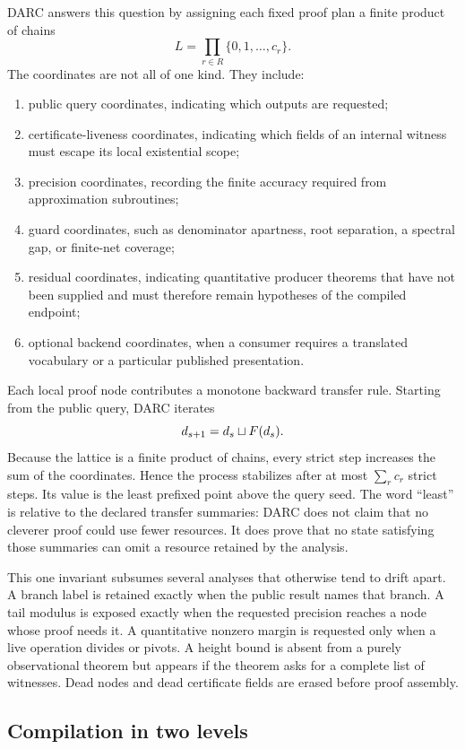 DARC answers this question by assigning each fixed proof plan a finite product
of chains
\[
  L = \prod_{r\in R} \{0,1,\ldots,c_r\}.
\]
The coordinates are not all of one kind.  They include:
\begin{enumerate}
  \item public query coordinates, indicating which outputs are requested;
  \item certificate-liveness coordinates, indicating which fields of an
        internal witness must escape its local existential scope;
  \item precision coordinates, recording the finite accuracy required from
        approximation subroutines;
  \item guard coordinates, such as denominator apartness, root separation, a
        spectral gap, or finite-net coverage;
  \item residual coordinates, indicating quantitative producer theorems that
        have not been supplied and must therefore remain hypotheses of the
        compiled endpoint;
  \item optional backend coordinates, when a consumer requires a translated
        vocabulary or a particular published presentation.
\end{enumerate}
Each local proof node contributes a monotone backward transfer rule.  Starting
from the public query, DARC iterates
\[
  d_{s+1}=d_s\mathbin{\sqcup} F(d_s).
\]
Because the lattice is a finite product of chains, every strict step increases
the sum of the coordinates.  Hence the process stabilizes after at most
\(\sum_r c_r\) strict steps.  Its value is the least prefixed point above the
query seed.  The word ``least'' is relative to the declared transfer summaries:
DARC does not claim that no cleverer proof could use fewer resources.  It does
prove that no state satisfying those summaries can omit a resource retained by
the analysis.

This one invariant subsumes several analyses that otherwise tend to drift
apart.  A branch label is retained exactly when the public result names that
branch.  A tail modulus is exposed exactly when the requested precision reaches
a node whose proof needs it.  A quantitative nonzero margin is requested only
when a live operation divides or pivots.  A height bound is absent from a
purely observational theorem but appears if the theorem asks for a complete
list of witnesses.  Dead nodes and dead certificate fields are erased before
proof assembly.

\subsection{Compilation in two levels}

